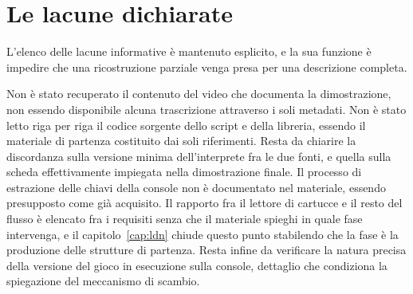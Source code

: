 \section{Le lacune dichiarate}

L'elenco delle lacune informative è mantenuto esplicito, e la sua funzione è impedire che una ricostruzione parziale venga presa per una descrizione completa.

Non è stato recuperato il contenuto del video che documenta la dimostrazione, non essendo disponibile alcuna trascrizione attraverso i soli metadati. Non è stato letto riga per riga il codice sorgente dello script e della libreria, essendo il materiale di partenza costituito dai soli riferimenti. Resta da chiarire la discordanza sulla versione minima dell'interprete fra le due fonti, e quella sulla scheda effettivamente impiegata nella dimostrazione finale. Il processo di estrazione delle chiavi della console non è documentato nel materiale, essendo presupposto come già acquisito. Il rapporto fra il lettore di cartucce e il resto del flusso è elencato fra i requisiti senza che il materiale spieghi in quale fase intervenga, e il capitolo~\ref{cap:ldn} chiude questo punto stabilendo che la fase è la produzione delle strutture di partenza. Resta infine da verificare la natura precisa della versione del gioco in esecuzione sulla console, dettaglio che condiziona la spiegazione del meccanismo di scambio.
